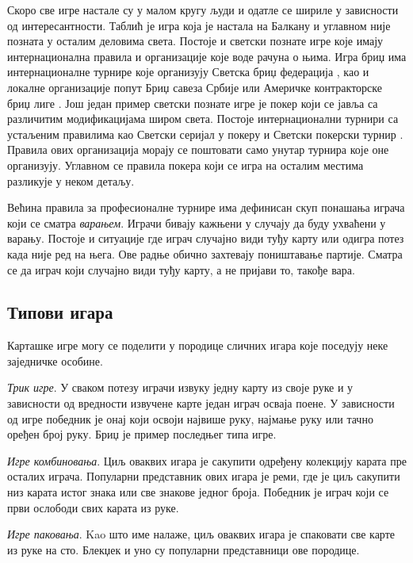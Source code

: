 \documentclass[a4paper, 12pt, ngerman]{article}
\let\oldsubsection\subsection
\renewcommand\subsection{\clearpage\oldsubsection}
\newcommand{\quotesrb}[1]{\glqq#1\grqq}
\begin{document}
Скоро све игре настале су у малом кругу људи и одатле се шириле у зависности од интересантности. Таблић је игра која је настала на Балкану и углавном није позната у осталим деловима света. Постоје и светски познате игре које имају интернационална правила и организације које воде рачуна о њима. Игра бриџ има интернационалне турнире које организују Светска бриџ федерација \cite{worldbridge}, као и локалне организације попут Бриџ савеза Србије \cite{serbianbridge} или Америчке контракторске бриџ лиге \cite{americanbridge}. Још један пример светски познате игре је покер који се јавља са различитим модификацијама широм света. Постоје интернационални турнири са устаљеним правилима као Светски серијал у покеру \cite{worldseriesofpoker} и Светски покерски турнир \cite{worldpokertour}. Правила ових организација морају се поштовати само унутар турнира које оне организују. Углавном се правила покера који се игра на осталим местима разликује у неком детаљу.

Већина правила за професионалне турнире има дефинисан скуп понашања играча који се сматра \textit{варањем}. Играчи бивају кажњени у случају да буду ухваћени у варању. Постоје и ситуације где играч случајно види туђу карту или одигра потез када није ред на њега. Ове радње обично захтевају поништавање партије. Сматра се да играч који случајно види туђу карту, а не пријави то, такође вара.

\subsection{Типови игара}
Карташке игре могу се поделити у породице сличних игара које поседују неке заједничке особине.

\textit{Трик игре}. У сваком потезу играчи извуку једну карту из своје руке и у зависности од вредности извучене карте један играч осваја поене. У зависности од игре победник је онај који освоји највише руку, најмање руку или тачно оређен број руку. Бриџ је пример последњег типа игре.

\textit{Игре комбиновања}. Циљ оваквих игара је сакупити одређену колекцију карата пре осталих играча. Популарни представник ових игара је реми, где је циљ сакупити низ карата истог знака или све знакове једног броја. Победник је играч који се први ослободи свих карата из руке.

\textit{Игре паковања}. Kao што име налаже, циљ оваквих игара је \quotesrb{спаковати} све карте из руке на сто. Блекџек и уно су популарни представници ове породице.
\end{document}
